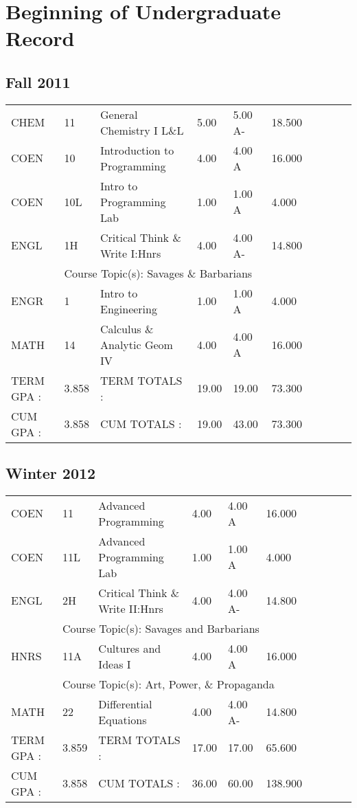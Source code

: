 \documentclass{scrartcl}\usepackage[T1]{fontenc}
\begin{document}
\section{Beginning of Undergraduate Record}
\subsection{Fall 2011}
\begin{tabular}{ l  l  l  l  l  l  l  l  l  l }
CHEM&11&General Chemistry I L\&L&5.00&5.00 A-&18.500& & & & \\
COEN&10&Introduction to Programming&4.00&4.00 A&16.000& & & & \\
COEN&10L&Intro to Programming Lab&1.00&1.00 A&4.000& & & & \\
ENGL&1H&Critical Think \& Write I:Hnrs&4.00&4.00 A-&14.800& & & & \\
\multicolumn{1}{l}{ }
&
\multicolumn{9}{l}{Course Topic(s): Savages \& Barbarians}
\\
ENGR&1&Intro to Engineering&1.00&1.00 A&4.000& & & & \\
MATH&14&Calculus \& Analytic Geom IV&4.00&4.00 A&16.000& & & & \\
\hline
TERM GPA :&3.858&TERM TOTALS :&19.00&19.00&73.300& & & & \\
CUM GPA :&3.858&CUM TOTALS :&19.00&43.00&73.300& & & & \\\end{tabular}
\subsection{Winter 2012}
\begin{tabular}{ l  l  l  l  l  l  l  l  l  l }
COEN&11&Advanced Programming&4.00&4.00 A&16.000& & & & \\
COEN&11L&Advanced Programming Lab&1.00&1.00 A&4.000& & & & \\
ENGL&2H&Critical Think \& Write II:Hnrs&4.00&4.00 A-&14.800& & & & \\
\multicolumn{1}{l}{ }
&
\multicolumn{9}{l}{Course Topic(s): Savages and Barbarians}
\\
HNRS&11A&Cultures and Ideas I&4.00&4.00 A&16.000& & & & \\
\multicolumn{1}{l}{ }
&
\multicolumn{9}{l}{Course Topic(s): Art, Power, \& Propaganda}
\\
MATH&22&Differential Equations&4.00&4.00 A-&14.800& & & & \\
\hline
TERM GPA :&3.859&TERM TOTALS :&17.00&17.00&65.600& & & & \\
CUM GPA :&3.858&CUM TOTALS :&36.00&60.00&138.900& & & & \\\end{tabular}
\end{document}
